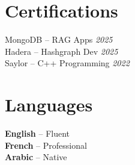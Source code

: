 \documentclass[10pt,a4paper]{article}
\begin{document}
\section*{Certifications}
{\footnotesize
MongoDB -- RAG Apps \hfill \textit{2025}\\
Hadera -- Hashgraph Dev \hfill \textit{2025}\\
Saylor -- C++ Programming \hfill \textit{2022}
}

\section*{Languages}
{\footnotesize
\textbf{English} -- Fluent\\
\textbf{French} -- Professional\\
\textbf{Arabic} -- Native
}
\end{document}
